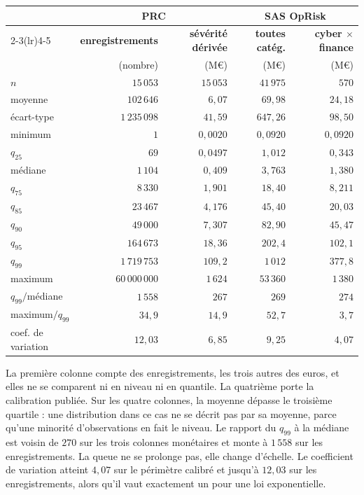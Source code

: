 \begin{center}\small
\renewcommand{\arraystretch}{1.1}
\begin{tabular}{@{}l r r r r@{}}
\toprule
& \multicolumn{2}{c}{\textbf{PRC}} & \multicolumn{2}{c}{\textbf{SAS OpRisk}} \\
\cmidrule(lr){2-3}\cmidrule(lr){4-5}
& \textbf{enregistrements} & \textbf{sévérité dérivée} & \textbf{toutes catég.} &
\textbf{cyber $\times$ finance} \\
& (nombre) & (M\euro) & (M\euro) & (M\euro) \\
\midrule
$n$              & $15\,053$     & $15\,053$   & $41\,975$  & $570$ \\
moyenne          & $102\,646$    & $6{,}07$    & $69{,}98$  & $24{,}18$ \\
écart-type       & $1\,235\,098$ & $41{,}59$   & $647{,}26$ & $98{,}50$ \\
minimum          & $1$           & $0{,}0020$  & $0{,}0920$ & $0{,}0920$ \\
\midrule
$q_{25}$         & $69$          & $0{,}0497$  & $1{,}012$  & $0{,}343$ \\
médiane          & $1\,104$      & $0{,}409$   & $3{,}763$  & $1{,}380$ \\
$q_{75}$         & $8\,330$      & $1{,}901$   & $18{,}40$  & $8{,}211$ \\
$q_{85}$         & $23\,467$     & $4{,}176$   & $45{,}40$  & $20{,}03$ \\
$q_{90}$         & $49\,000$     & $7{,}307$   & $82{,}90$  & $45{,}47$ \\
$q_{95}$         & $164\,673$    & $18{,}36$   & $202{,}4$  & $102{,}1$ \\
$q_{99}$         & $1\,719\,753$ & $109{,}2$   & $1\,012$   & $377{,}8$ \\
maximum          & $60\,000\,000$& $1\,624$    & $53\,360$  & $1\,380$ \\
\midrule
$q_{99}/$médiane & $1\,558$      & $267$       & $269$      & $274$ \\
maximum$/q_{99}$ & $34{,}9$      & $14{,}9$    & $52{,}7$   & $3{,}7$ \\
coef. de variation & $12{,}03$   & $6{,}85$    & $9{,}25$   & $4{,}07$ \\
\bottomrule
\end{tabular}
\end{center}

\vspace{2pt}
\noindent La première colonne compte des enregistrements, les trois autres des euros, et elles
ne se comparent ni en niveau ni en quantile. La quatrième porte la calibration publiée. Sur les quatre
colonnes, la moyenne dépasse le troisième quartile : une distribution dans ce cas ne se décrit pas par
sa moyenne, parce qu'une minorité d'observations en fait le niveau. Le rapport du $q_{99}$ à la médiane
est voisin de $270$ sur les trois colonnes monétaires et monte à $1\,558$ sur les enregistrements. La
queue ne se prolonge pas, elle change d'échelle. Le coefficient de variation atteint $4{,}07$ sur le
périmètre calibré et jusqu'à $12{,}03$ sur les enregistrements, alors qu'il vaut exactement un pour une
loi exponentielle.

